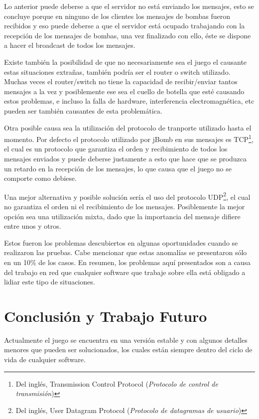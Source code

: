 \documentclass[a4paper,12pt,openany,oneside]{book}
\begin{document}
Lo anterior puede deberse a que el servidor no está enviando los mensajes, esto se concluye porque en ninguno de los clientes los mensajes de bombas fueron recibidos y eso puede deberse a que el servidor está ocupado trabajando con la recepción de los mensajes de bombas, una vez finalizado con ello, éste se dispone a hacer el broadcast de todos los mensajes.

Existe también la posibilidad de que no necesariamente sea el juego el causante estas situaciones extrañas, también podría ser el router o switch utilizado. Muchas veces el router/switch no tiene la capacidad de recibir/enviar tantos mensajes a la vez y posiblemente ese sea el cuello de botella que esté causando estos problemas, e incluso la falla de hardware, interferencia electromagnética, etc pueden ser también causantes de esta problemática.

Otra posible causa sea la utilización del protocolo de tranporte utilizado hasta el momento. Por defecto el protocolo utilizado por jBomb en sus mensajes es TCP\footnote{Del inglés, Transmission Control Protocol (\textit{Protocolo de control de transmisión})}, el cual es un protocolo que garantiza el orden y recibimiento de todos los mensajes enviados y puede deberse justamente a esto que hace que se produzca un retardo en la recepción de los mensajes, lo que causa que el juego no se comporte como debiese.

Una mejor alternativa y posible solución sería el uso del protocolo UDP\footnote{Del inglés, User Datagram Protocol (\textit{Protocolo de datagramas de usuario})}, el cual no garantiza el orden ni el recibimiento de los mensajes. Posiblemente la mejor opción sea una utilización mixta, dado que la importancia del mensaje difiere entre unos y otros.

Estos fueron los problemas descubiertos en algunas oportunidades cuando se realizaron las pruebas. Cabe mencionar que estas anomalías se presentaron sólo en un 10\% de los casos. En resumen, los problemas aquí presentados son a causa del trabajo en red que cualquier software que trabaje sobre ella está obligado a lidiar este tipo de situaciones.
\chapter{Conclusión y Trabajo Futuro}
Actualmente el juego se encuentra en una versión estable y con algunos detalles menores que pueden ser solucionados, los cuales están siempre dentro del ciclo de vida de cualquier software.
\end{document}
